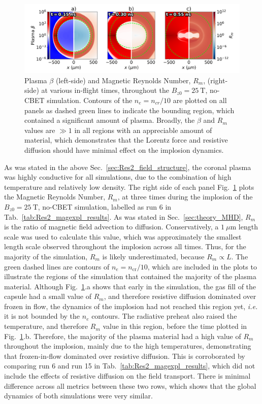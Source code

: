 \begin{figure}[t!]
    \includegraphics[width=\linewidth]{Results2/Images/magmag_beta_Rm.png}
    \centering
    \caption{Plasma $\beta$ (left-side) and Magnetic Reynolds Number, $R_m$, (right-side) at various in-flight times, throughout the $B_{z0}=25\ \text{T}$, no-\ac{CBET} simulation.
    Contours of the $n_e=n_{cr}/10$ are plotted on all panels as dashed green lines to indicate the bounding region, which contained a significant amount of plasma.
    Broadly, the $\beta$ and $R_m$ values are $\gg 1$ in all regions with an appreciable amount of material, which demonstrates that the Lorentz force and resistive diffusion should have minimal effect on the implosion dynamics.}%
    \label{fig:Res2_magmag_beta_Rm}
\end{figure}

As was stated in the above Sec.~\ref{sec:Res2_field_structure}, the coronal plasma was highly conductive for all simulations, due to the combination of high temperature and relatively low density.
The right side of each panel Fig.~\ref{fig:Res2_magmag_beta_Rm} plots the Magnetic Reynolds Number, $R_m$, at three times during the implosion of the $B_{z0}=25\ \text{T}$, no-\ac{CBET} simulation, labelled as run 6 in Tab.~\ref{tab:Res2_magexpl_results}.
As was stated in Sec.~\ref{sec:theory_MHD}, $R_m$ is the ratio of magnetic field advection to diffusion.
Conservatively, a $1\ \mu\text{m}$ length scale was used to calculate this value, which was approximately the smallest length scale observed throughout the implosion across all times.
Thus, for the majority of the simulation, $R_m$ is likely underestimated, because $R_m\propto L$.
The green dashed lines are contours of $n_e=n_{\text{cr}}/10$, which are included in the plots to illustrate the regions of the simulation that contained the majority of the plasma material.
Although Fig.~\ref{fig:Res2_magmag_beta_Rm}.a shows that early in the simulation, the gas fill of the capsule had a small value of $R_m$, and therefore resistive diffusion dominated over frozen in flow, the dynamics of the implosion had not reached this region yet, \textit{i.e.} it is not bounded by the $n_e$ contours.
The radiative preheat also raised the temperature, and therefore $R_m$ value in this region, before the time plotted in Fig.~\ref{fig:Res2_magmag_beta_Rm}.b.
Therefore, the majority of the plasma material had a high value of $R_m$ throughout the implosion, mainly due to the high temperatures, demonstrating that frozen-in-flow dominated over resistive diffusion.
This is corroborated by comparing run 6 and run 15 in Tab.~\ref{tab:Res2_magexpl_results}, which did not include the effects of resistive diffusion on the field transport.
There is minimal difference across all metrics between these two rows, which shows that the global dynamics of both simulations were very similar.

